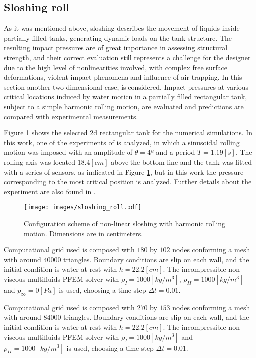 \subsection{Sloshing roll}

As it was mentioned above, sloshing describes the movement of liquids inside partially filled tanks, generating dynamic loads on the tank structure. The resulting impact pressures are of great importance in assessing structural strength, and their correct evaluation still represents a challenge for the designer due to the high level of nonlinearities involved, with complex free surface deformations, violent
impact phenomena and influence of air trapping. In this section another two-dimensional case, is considered. Impact pressures at various critical locations induced by water motion in a partially filled rectangular tank, subject to a simple harmonic rolling motion, are evaluated and predictions are compared with experimental measurements\cite{Delorme07}\cite{Delorme09}.

Figure \ref{fg:roll-config} shows the selected 2d rectangular tank for the numerical simulations. In this work, one of the experiments of \cite{Delorme07} is analyzed, in which a sinusoidal rolling motion was imposed with an amplitude of $\theta=4º$ and a period $T=1.19[s]$. The rolling axis was located $18.4[cm]$ above the bottom line and the tank was fitted with a series of sensors, as indicated in Figure \ref{fg:roll-config}, but in this work the pressure corresponding to the most critical position is analyzed. Further details about the experiment are also found in \cite{Brizzolara11}.

\begin{figure}[H]
  \begin{center}
      \texttt{[image: images/sloshing\_roll.pdf]}
  \end{center}
  \caption{\label{fg:roll-config} Configuration scheme of non-linear sloshing with harmonic rolling motion. Dimensions are in centimeters.}
\end{figure}

Computational grid used is composed with $180$ by $102$ nodes conforming a mesh with around $40000$ triangles. Boundary conditions are slip on each wall, and the initial condition is water at rest with $h=22.2[cm]$. The incompressible non-viscous multifluids PFEM solver with $\rho_{I}=1000[kg/m^3]$, $\rho_{II}=1000[kg/m^3]$ and $p_{\infty}=0[Pa]$ is used, choosing a time-step $\Delta t=0.01$.

Computational grid used is composed with $270$ by $153$ nodes conforming a mesh with around $84000$ triangles. Boundary conditions are slip on each wall, and the initial condition is water at rest with $h=22.2[cm]$. The incompressible non-viscous multifluids PFEM solver with $\rho_{I}=1000[kg/m^3]$ and $\rho_{II}=1000[kg/m^3]$ is used, choosing a time-step $\Delta t=0.01$.